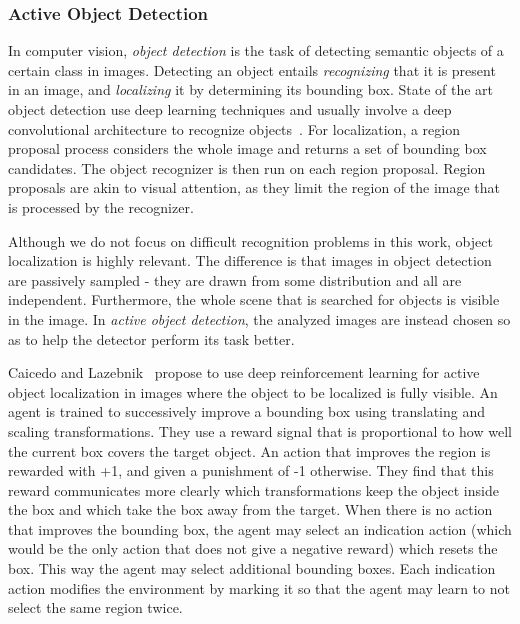 \subsubsection{Active Object Detection}

In computer vision, \textit{object detection} is the task of detecting semantic objects of a certain class in images.
Detecting an object entails \textit{recognizing} that it is present in an image, and \textit{localizing} it by determining its bounding box.
State of the art object detection use deep learning techniques and usually involve a deep convolutional architecture to recognize objects~\cite{zhao_object_2019}.
For localization, a region proposal process considers the whole image and returns a set of bounding box candidates.
The object recognizer is then run on each region proposal.
Region proposals are akin to visual attention, as they limit the region of the image that is processed by the recognizer.

Although we do not focus on difficult recognition problems in this work, object localization is highly relevant.
The difference is that images in object detection are passively sampled - they are drawn from some distribution and all are independent.
Furthermore, the whole scene that is searched for objects is visible in the image.
In \textit{active object detection}, the analyzed images are instead chosen so as to help the detector perform its task better.

Caicedo and Lazebnik~\cite{caicedo_active_2015} propose to use deep reinforcement learning for active object localization in images where the object to be localized is fully visible.
An agent is trained to successively improve a bounding box using translating and scaling transformations.
They use a reward signal that is proportional to how well the current box covers the target object.
An action that improves the region is rewarded with +1, and given a punishment of -1 otherwise.
They find that this reward communicates more clearly which transformations keep the object inside the box and which take the box away from the target.
When there is no action that improves the bounding box, the agent may select an indication action (which would be the only action that does not give a negative reward) which resets the box.
This way the agent may select additional bounding boxes.
Each indication action modifies the environment by marking it so that the agent may learn to not select the same region twice.

